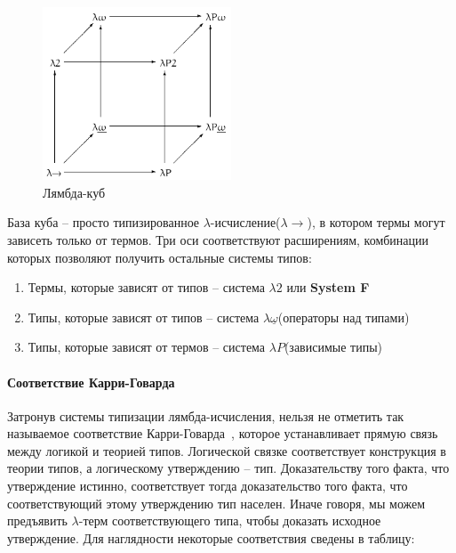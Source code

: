 \begin{figure}[H]
  \centering
  \includegraphics[width=0.5\textwidth]{img/Lambda_cube.png}
  \caption{Лямбда-куб}
\end{figure}

База куба -- просто типизированное $\lambda$-исчисление($\lambda{\to}$), в котором термы могут зависеть только от термов. Три оси соответствуют расширениям, комбинации которых позволяют получить остальные системы типов:

\begin{enumerate}
  \item Термы, которые зависят от типов -- система $\lambda2$ или \textbf{System F}
  \item Типы, которые зависят от типов -- система $\lambda \underline{\omega}$(операторы над типами)
  \item Типы, которые зависят от термов -- система $\lambda P$(зависимые типы)
\end{enumerate}

\paragraph{Соответствие Карри-Говарда}
Затронув системы типизации лямбда-исчисления, нельзя не отметить так называемое соответствие Карри-Говарда~\cite{howard1980formulae}, которое устанавливает прямую связь между логикой и теорией типов. Логической связке соответствует конструкция в теории типов, а логическому утверждению -- тип. Доказательству того факта, что утверждение истинно, соответствует тогда доказательство того факта, что соответствующий этому утверждению тип населен. Иначе говоря, мы можем предъявить $\lambda$-терм соответствующего типа, чтобы доказать исходное утверждение. Для наглядности некоторые соответствия сведены в таблицу:

